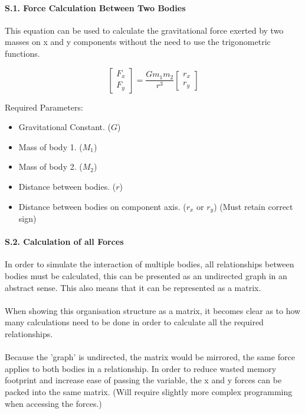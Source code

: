 \paragraph{S.1. Force Calculation Between Two Bodies}
This equation can be used to calculate the gravitational force exerted by two masses on x and y components without the need to use the trigonometric functions.

$$\begin{bmatrix} F_x \\ F_y \end{bmatrix} = \frac{Gm_1m_2}{r^3} \begin{bmatrix} r_x \\ r_y \end{bmatrix}$$

Required Parameters:
\begin{itemize}
\item Gravitational Constant. ($G$)
\item Mass of body 1. ($M_1$)
\item Mass of body 2. ($M_2$)
\item Distance between bodies. ($r$)
\item Distance between bodies on component axis. ($r_x$ or $r_y$) (Must retain correct sign)
\end{itemize}

\paragraph{S.2. Calculation of all Forces}
In order to simulate the interaction of multiple bodies, all relationships between bodies must be calculated, this can be presented as an undirected graph in an abstract sense. This also means that it can be represented as a matrix. 

\paragraph{}
When showing this organisation structure as a matrix, it becomes clear as to how many calculations need to be done in order to calculate all the required relationships.

\paragraph{}
Because the 'graph' is undirected, the matrix would be mirrored, the same force applies to both bodies in a relationship.
In order to reduce wasted memory footprint and increase ease of passing the variable, the x and y forces can be packed into the same matrix. (Will require slightly more complex programming when accessing the forces.)

